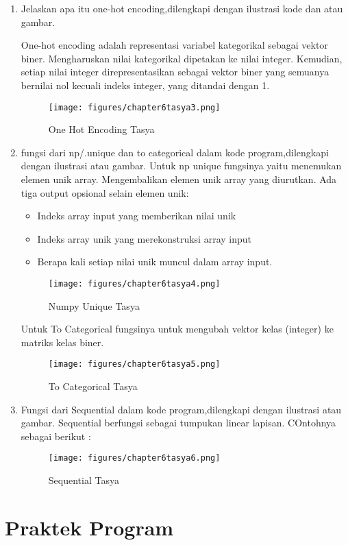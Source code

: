 \begin{enumerate}
\item Jelaskan apa itu one-hot encoding,dilengkapi dengan ilustrasi kode dan atau gambar.
\par One-hot encoding adalah representasi variabel kategorikal sebagai vektor biner. Mengharuskan nilai kategorikal dipetakan ke nilai integer. Kemudian, setiap nilai integer direpresentasikan sebagai vektor biner yang semuanya bernilai nol kecuali indeks integer, yang ditandai dengan 1.
\begin{figure}[ht]
\centering
\texttt{[image: figures/chapter6tasya3.png]}
\caption{One Hot Encoding Tasya}
\label{Teori}
\end{figure}

\item fungsi dari np/.unique dan to categorical dalam kode program,dilengkapi dengan ilustrasi atau gambar.
Untuk np unique fungsinya yaitu menemukan elemen unik array. Mengembalikan elemen unik array yang diurutkan. Ada tiga output opsional selain elemen unik:
\begin{itemize}
\item Indeks array input yang memberikan nilai unik
\item Indeks array unik yang merekonstruksi array input
\item Berapa kali setiap nilai unik muncul dalam array input.
\end{itemize}
\begin{figure}[ht]
\centering
\texttt{[image: figures/chapter6tasya4.png]}
\caption{Numpy Unique Tasya}
\label{Teori}
\end{figure}

Untuk  To Categorical fungsinya untuk mengubah vektor kelas (integer) ke matriks kelas biner.
\begin{figure}[ht]
\centering
\texttt{[image: figures/chapter6tasya5.png]}
\caption{To Categorical Tasya}
\label{Teori}
\end{figure}

\item Fungsi dari Sequential dalam kode program,dilengkapi dengan ilustrasi atau gambar.
Sequential berfungsi sebagai tumpukan linear lapisan. COntohnya sebagai berikut :
\begin{figure}[ht]
\centering
\texttt{[image: figures/chapter6tasya6.png]}
\caption{Sequential Tasya}
\label{Teori}
\end{figure}
\end{enumerate}

\section{Praktek Program}
